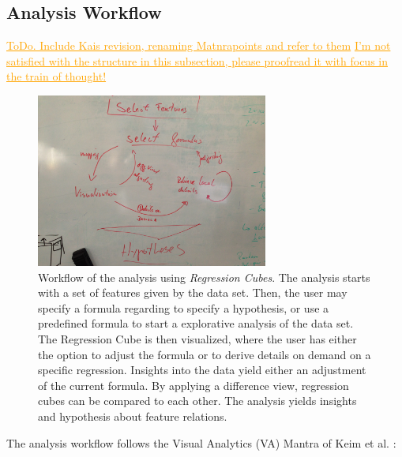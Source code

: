 \documentclass[journal]{style/vgtc} 			          %
\newcommand{\com}[1]{\textcolor{orange}{\uline{#1}}}
\begin{document}
\subsection{Analysis Workflow}
\com{ToDo. Include Kais revision, renaming Matnrapoints and refer to them}
\com{I'm not satisfied with the structure in this subsection, please proofread it with focus in the train of thought!}
\begin{figure}[htb]
 \centering
 \includegraphics[width=3.0in]{figures/workflow_sketch}
 \caption{
 Workflow of the analysis using \emph{Regression Cubes}.
 The analysis starts with a set of features given by the data set.
 Then, the user may specify a formula regarding to specify a hypothesis, or use a predefined formula to start a explorative analysis of the data set.
 The Regression Cube is then visualized, where the user has either the option to adjust the formula or to derive details on demand on a specific regression.
 Insights into the data yield either an adjustment of the current formula.
 By applying a difference view, regression cubes can be compared to each other.
 The analysis yields insights and hypothesis about feature relations.
 }
  \label{fig:Workflow}
\end{figure}
The analysis workflow follows the Visual Analytics (VA) Mantra of Keim et al. \cite{Keim}:
\end{document}
